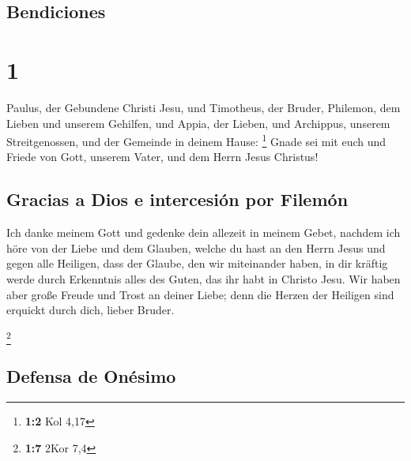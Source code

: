 \hypertarget{bendiciones}{%
\subsection{Bendiciones}\label{bendiciones}}

\hypertarget{section}{%
\section{1}\label{section}}

 Paulus, der Gebundene Christi Jesu, und Timotheus, der
Bruder, Philemon, dem Lieben und unserem Gehilfen,  und
Appia, der Lieben, und Archippus, unserem Streitgenossen, und der
Gemeinde in deinem Hause: \footnote{\textbf{1:2} Kol 4,17}
 Gnade sei mit euch und Friede von Gott, unserem Vater,
und dem Herrn Jesus Christus!

\hypertarget{gracias-a-dios-e-intercesiuxf3n-por-filemuxf3n}{%
\subsection{Gracias a Dios e intercesión por
Filemón}\label{gracias-a-dios-e-intercesiuxf3n-por-filemuxf3n}}

 Ich danke meinem Gott und gedenke dein allezeit in meinem
Gebet,  nachdem ich höre von der Liebe und dem Glauben,
welche du hast an den Herrn Jesus und gegen alle Heiligen,
 dass der Glaube, den wir miteinander haben, in dir
kräftig werde durch Erkenntnis alles des Guten, das ihr habt in Christo
Jesu.  Wir haben aber große Freude und Trost an deiner
Liebe; denn die Herzen der Heiligen sind erquickt durch dich, lieber
Bruder.

\footnote{\textbf{1:7} 2Kor 7,4}

\hypertarget{defensa-de-onuxe9simo}{%
\subsection{Defensa de Onésimo}\label{defensa-de-onuxe9simo}}

